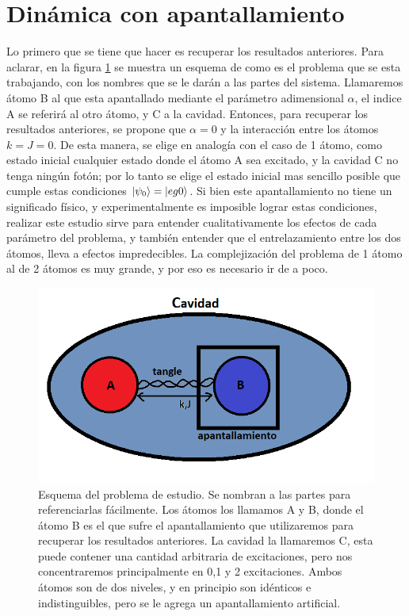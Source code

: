 \section{Dinámica con apantallamiento}

Lo primero que se tiene que hacer es recuperar los resultados anteriores. Para aclarar, en la figura \ref{fig4:diagrama esquematico} se muestra un esquema de como es el problema que se esta trabajando, con los nombres que se le darán a las partes del sistema. Llamaremos átomo B al que esta apantallado mediante el parámetro adimensional $\alpha$, el indice A se referirá al otro átomo, y C a la cavidad. Entonces, para recuperar los resultados anteriores, se propone que $\alpha=0$ y la interacción entre los átomos $k=J=0$. De esta manera, se elige en analogía con el caso de 1 átomo, como estado inicial cualquier estado donde el átomo A sea excitado, y la cavidad C no tenga ningún fotón; por lo tanto se elige el estado inicial mas sencillo posible que cumple estas condiciones $\ket{\psi_0}=\ket{eg0}$. Si bien este apantallamiento no tiene un significado físico, y experimentalmente es imposible lograr estas condiciones, realizar este estudio sirve para entender cualitativamente los efectos de cada parámetro del problema, y también entender que el entrelazamiento entre los dos átomos, lleva a efectos impredecibles. La complejización del problema de 1 átomo al de 2 átomos es muy grande, y por eso es necesario ir de a poco.
\begin{figure}[H]
    \begin{minipage}[c]{0.67\textwidth}
        \includegraphics[width=\textwidth]{figuras/ch4/diagrama esquematico.png}
    \end{minipage}\hfill
    \begin{minipage}[c]{0.3\textwidth}
    \caption{Esquema del problema de estudio. Se nombran a las partes para referenciarlas fácilmente. Los átomos los llamamos A y B, donde el átomo B es el que sufre el apantallamiento que utilizaremos para recuperar los resultados anteriores. La cavidad la llamaremos C, esta puede contener una cantidad arbitraria de excitaciones, pero nos concentraremos principalmente en 0,1 y 2 excitaciones. Ambos átomos son de dos niveles, y en principio son idénticos e indistinguibles, pero se le agrega un apantallamiento artificial.
         } \label{fig4:diagrama esquematico}
  \end{minipage}
\end{figure}
